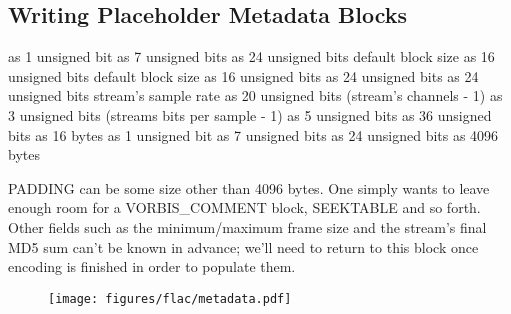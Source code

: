 \clearpage

\subsection{Writing Placeholder Metadata Blocks}
 as 1 unsigned bit
 as 7 unsigned bits
 as 24 unsigned bits
\WRITE default block size as 16 unsigned bits
\WRITE default block size as 16 unsigned bits
 as 24 unsigned bits
 as 24 unsigned bits
\WRITE stream's sample rate as 20 unsigned bits\;
\WRITE (stream's channels - 1) as 3 unsigned bits\;
\WRITE (streams bits per sample - 1) as 5 unsigned bits\;
 as 36 unsigned bits
 as 16 bytes
\BlankLine
\BlankLine
{} as 1 unsigned bit
 as 7 unsigned bits
 as 24 unsigned bits
 as 4096 bytes
\EALGORITHM
\par
\noindent
PADDING can be some size other than 4096 bytes.
One simply wants to leave enough room for a VORBIS\_COMMENT block,
SEEKTABLE and so forth.
Other fields such as the minimum/maximum frame size
and the stream's final MD5 sum can't be known in advance;
we'll need to return to this block once encoding is finished
in order to populate them.
\begin{figure}[h]
\texttt{[image: figures/flac/metadata.pdf]}
\end{figure}


\clearpage

